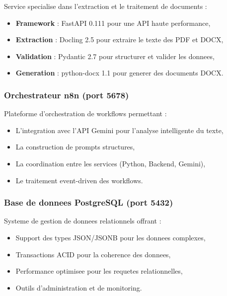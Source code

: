 Service specialise dans l'extraction et le traitement de documents :

\begin{itemize}
    \item \textbf{Framework} : FastAPI 0.111 pour une API haute performance,
    
    \item \textbf{Extraction} : Docling 2.5 pour extraire le texte des PDF et DOCX,
    
    \item \textbf{Validation} : Pydantic 2.7 pour structurer et valider les donnees,
    
    \item \textbf{Generation} : python-docx 1.1 pour generer des documents DOCX.
\end{itemize}

\subsubsection{Orchestrateur n8n (port 5678)}

Plateforme d'orchestration de workflows permettant :

\begin{itemize}
    \item L'integration avec l'API Gemini pour l'analyse intelligente du texte,
    
    \item La construction de prompts structures,
    
    \item La coordination entre les services (Python, Backend, Gemini),
    
    \item Le traitement event-driven des workflows.
\end{itemize}

\subsubsection{Base de donnees PostgreSQL (port 5432)}

Systeme de gestion de donnees relationnels offrant :

\begin{itemize}
    \item Support des types JSON/JSONB pour les donnees complexes,
    
    \item Transactions ACID pour la coherence des donnees,
    
    \item Performance optimisee pour les requetes relationnelles,
    
    \item Outils d'administration et de monitoring.
\end{itemize}

